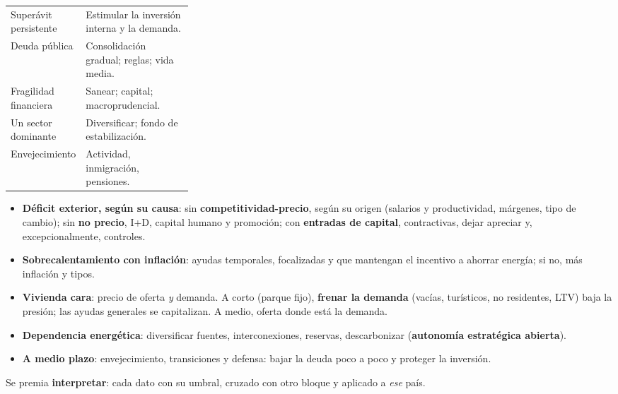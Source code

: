 \documentclass{article}
\begin{document}
\begin{columnas}
{\begin{tabularx}{\linewidth}{>{\raggedright\arraybackslash}p{0.3\linewidth}>{\raggedright\arraybackslash}X}
\rowcolor{tceesalvia}Superávit persistente & Estimular la inversión interna y la demanda.\\
Deuda pública & Consolidación gradual; reglas; vida media.\\
\rowcolor{tceesalvia}Fragilidad financiera & Sanear; capital; macroprudencial.\\
Un sector dominante & Diversificar; fondo de estabilización.\\
\rowcolor{tceesalvia}Envejecimiento & Actividad, inmigración, pensiones.\\
\bottomrule
\end{tabularx}}
\begin{itemize}[itemsep=1.5pt]
\item \textbf{Déficit exterior, según su causa}: sin \textbf{competitividad-precio}, según su origen (salarios y productividad, márgenes, tipo de cambio); sin \textbf{no precio}, I+D, capital humano y promoción; con \textbf{entradas de capital}, contractivas, dejar apreciar y, excepcionalmente, controles.
\item \textbf{Sobrecalentamiento con inflación}: ayudas temporales, focalizadas y que mantengan el incentivo a ahorrar energía; si no, más inflación y tipos.
\item \textbf{Vivienda cara}: precio de oferta \emph{y} demanda. A corto (parque fijo), \textbf{frenar la demanda} (vacías, turísticos, no residentes, LTV) baja la presión; las ayudas generales se capitalizan. A medio, oferta donde está la demanda.
\item \textbf{Dependencia energética}: diversificar fuentes, interconexiones, reservas, descarbonizar (\textbf{autonomía estratégica abierta}).
\item \textbf{A medio plazo}: envejecimiento, transiciones y defensa: bajar la deuda poco a poco y proteger la inversión.
\end{itemize}
\begin{ideaclave}
Se premia \textbf{interpretar}: cada dato con su umbral, cruzado con otro bloque y aplicado a \emph{ese} país.
\end{ideaclave}
\end{columnas}
\end{document}
